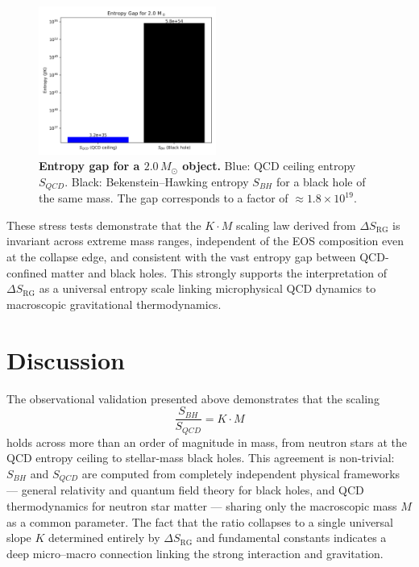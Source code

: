 \documentclass[aps,prd,onecolumn,nofootinbib,superscriptaddress]{revtex4-2}
\begin{document}
\begin{figure}[htbp]
\centering
\includegraphics[width=0.52\textwidth]{figures/entropy_gap.png}
\caption{\textbf{Entropy gap for a $2.0\,M_\odot$ object.} 
Blue: QCD ceiling entropy $S_{QCD}$. 
Black: Bekenstein--Hawking entropy $S_{BH}$ for a black hole of the same mass. 
The gap corresponds to a factor of $\approx 1.8\times 10^{19}$.}
\label{fig:entropy_gap}
\end{figure}

These stress tests demonstrate that the $K \cdot M$ scaling law derived from $\Delta S_{\mathrm{RG}}$ is invariant across extreme mass ranges, independent of the EOS composition even at the collapse edge, and consistent with the vast entropy gap between QCD-confined matter and black holes. This strongly supports the interpretation of $\Delta S_{\mathrm{RG}}$ as a universal entropy scale linking microphysical QCD dynamics to macroscopic gravitational thermodynamics.

\section{Discussion}

The observational validation presented above demonstrates that the scaling 
\[
\frac{S_{BH}}{S_{QCD}} = K \cdot M
\]
holds across more than an order of magnitude in mass, from neutron stars at the QCD entropy ceiling to stellar-mass black holes. This agreement is non-trivial: $S_{BH}$ and $S_{QCD}$ are computed from completely independent physical frameworks — general relativity and quantum field theory for black holes, and QCD thermodynamics for neutron star matter — sharing only the macroscopic mass $M$ as a common parameter. The fact that the ratio collapses to a single universal slope $K$ determined entirely by $\Delta S_{\mathrm{RG}}$ and fundamental constants indicates a deep micro–macro connection linking the strong interaction and gravitation. 
\end{document}

